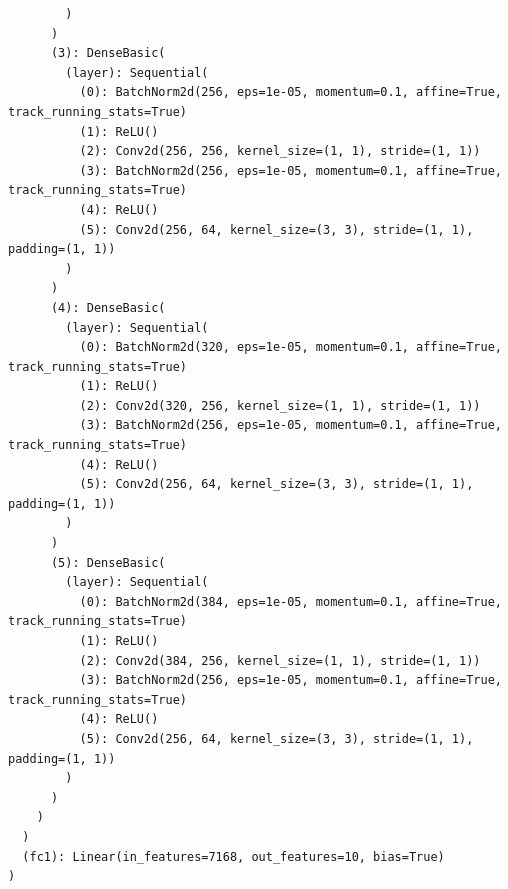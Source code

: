 \documentclass{article}
\begin{document}
\begin{lstlisting}
        )
      )
      (3): DenseBasic(
        (layer): Sequential(
          (0): BatchNorm2d(256, eps=1e-05, momentum=0.1, affine=True, track_running_stats=True)
          (1): ReLU()
          (2): Conv2d(256, 256, kernel_size=(1, 1), stride=(1, 1))
          (3): BatchNorm2d(256, eps=1e-05, momentum=0.1, affine=True, track_running_stats=True)
          (4): ReLU()
          (5): Conv2d(256, 64, kernel_size=(3, 3), stride=(1, 1), padding=(1, 1))
        )
      )
      (4): DenseBasic(
        (layer): Sequential(
          (0): BatchNorm2d(320, eps=1e-05, momentum=0.1, affine=True, track_running_stats=True)
          (1): ReLU()
          (2): Conv2d(320, 256, kernel_size=(1, 1), stride=(1, 1))
          (3): BatchNorm2d(256, eps=1e-05, momentum=0.1, affine=True, track_running_stats=True)
          (4): ReLU()
          (5): Conv2d(256, 64, kernel_size=(3, 3), stride=(1, 1), padding=(1, 1))
        )
      )
      (5): DenseBasic(
        (layer): Sequential(
          (0): BatchNorm2d(384, eps=1e-05, momentum=0.1, affine=True, track_running_stats=True)
          (1): ReLU()
          (2): Conv2d(384, 256, kernel_size=(1, 1), stride=(1, 1))
          (3): BatchNorm2d(256, eps=1e-05, momentum=0.1, affine=True, track_running_stats=True)
          (4): ReLU()
          (5): Conv2d(256, 64, kernel_size=(3, 3), stride=(1, 1), padding=(1, 1))
        )
      )
    )
  )
  (fc1): Linear(in_features=7168, out_features=10, bias=True)
)
\end{lstlisting}
\end{document}
